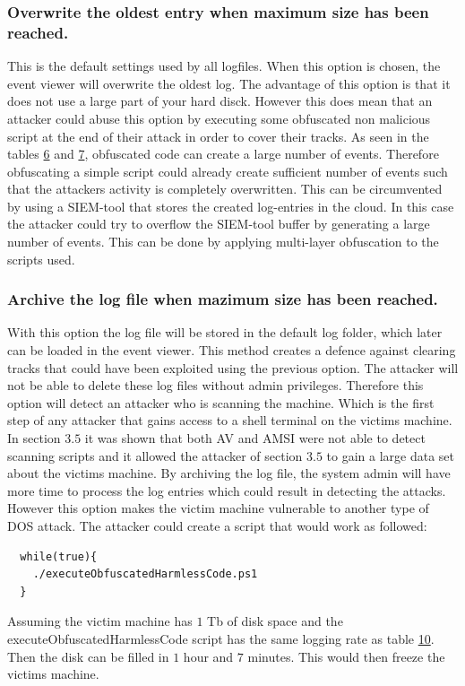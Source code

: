 \documentclass{article}%
\begin{document}
\subsubsection{Overwrite the oldest entry when maximum size has been reached.}
This is the default settings used by all logfiles. When this option is chosen, the event viewer will overwrite the oldest log. The advantage of this option is that it does not use a large part of your hard disck. However this does mean that an attacker could abuse this option by executing some obfuscated non malicious script at the end of their attack in order to cover their tracks. As seen in the tables \hyperlink{table6}{6} and \hyperlink{table7}{7}, obfuscated code can create a large number of events. Therefore obfuscating a simple script could already create sufficient number of events such that the attackers activity is completely overwritten. This can be circumvented by using a SIEM-tool that stores the created log-entries in the cloud. In this case the attacker could try to overflow the SIEM-tool buffer by generating a large number of events. This can be done by applying multi-layer obfuscation to the scripts used.
\subsubsection{Archive the log file when mazimum size has been reached.}
With this option the log file will be stored in the default log folder, which later can be loaded in the event viewer. This method creates a defence against clearing tracks that could have been exploited using the previous option. The attacker will not be able to delete these log files without admin privileges. Therefore this option will detect an attacker who is scanning the machine. Which is the first step of any attacker that gains access to a shell terminal on the victims machine. In section $3.5$ it was shown that both AV and AMSI were not able to detect scanning scripts and it allowed the attacker of section $3.5$ to gain a large data set about the victims machine. By archiving the log file, the system admin will have more time to process the log entries which could result in detecting the attacks. However this option makes the victim machine vulnerable to another type of DOS attack. The attacker could create a script that would work as followed:
\begin{verbatim}
  while(true){
  	./executeObfuscatedHarmlessCode.ps1
  }
\end{verbatim}
Assuming the victim machine has $1$ Tb of disk space and the executeObfuscatedHarmlessCode script has the same logging rate as table \hyperlink{table10}{10}. Then the disk can be filled in $1$ hour and $7$ minutes. This would then freeze the victims machine.
\end{document}
